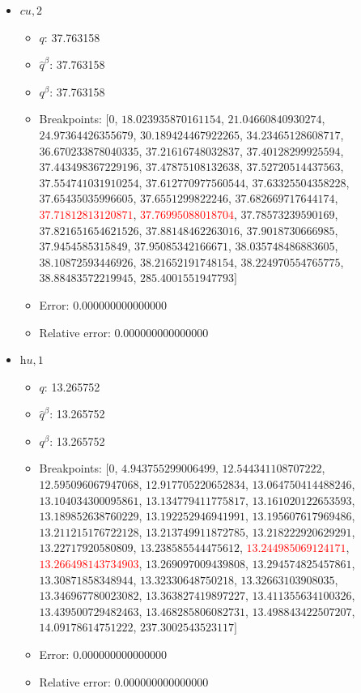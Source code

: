 \documentclass{article}%
\begin{document}
\begin{itemize}
\begin{itemize}
	\end{itemize}%
	\item $\textit{cu},2$%
	\begin{itemize}%
		\item $q$: 37.763158%
		\item $\hat{q}^\beta$: 37.763158%
		\item $q^\beta$: 37.763158%
		\item Breakpoints: $[$$0$, $18.023935870161154$, $21.04660840930274$, $24.97364426355679$, $30.189424467922265$, $34.23465128608717$, $36.670233878040335$, $37.21616748032837$, $37.40128299925594$, $37.443498367229196$, $37.47875108132638$, $37.52720514437563$, $37.554741031910254$, $37.612770977560544$, $37.63325504358228$, $37.65435035996605$, $37.6551299822246$, $37.682669717644174$, \textcolor{red}{$37.71812813120871$}, \textcolor{red}{$37.76995088018704$}, $37.78573239590169$, $37.821651654621526$, $37.88148462263016$, $37.9018730666985$, $37.9454585315849$, $37.95085342166671$, $38.035748486883605$, $38.10872593446926$, $38.21652191748154$, $38.224970554765775$, $38.88483572219945$, $285.4001551947793$$]$%
		\item Error: 0.000000000000000%
		\item Relative error: 0.000000000000000%
	\end{itemize}%
	\item $\textit{hu},1$%
	\begin{itemize}%
		\item $q$: 13.265752%
		\item $\hat{q}^\beta$: 13.265752%
		\item $q^\beta$: 13.265752%
		\item Breakpoints: $[$$0$, $4.943755299006499$, $12.544341108707222$, $12.595096067947068$, $12.917705220652834$, $13.064750414488246$, $13.104034300095861$, $13.134779411775817$, $13.161020122653593$, $13.189852638760229$, $13.192252946941991$, $13.195607617969486$, $13.211215176722128$, $13.213749911872785$, $13.218222920629291$, $13.22717920580809$, $13.238585544475612$, \textcolor{red}{$13.244985069124171$}, \textcolor{red}{$13.266498143734903$}, $13.269097009439808$, $13.294574825457861$, $13.30871858348944$, $13.32330648750218$, $13.32663103908035$, $13.346967780023082$, $13.363827419897227$, $13.411355634100326$, $13.439500729482463$, $13.468285806082731$, $13.498843422507207$, $14.09178614751222$, $237.3002543523117$$]$%
		\item Error: 0.000000000000000%
		\item Relative error: 0.000000000000000%
	\end{itemize}%
\end{itemize}%
\end{document}
